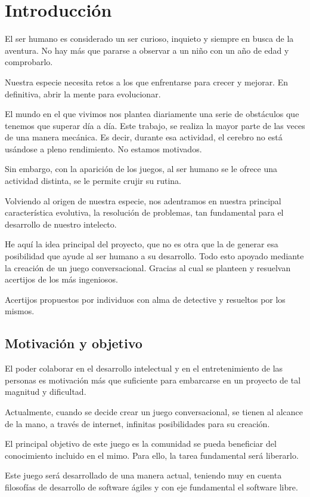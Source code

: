\chapter{Introducción}
El ser humano es considerado un ser curioso, inquieto y siempre en busca de la aventura. No hay más que pararse a observar a un niño con un año de edad y comprobarlo.

Nuestra especie necesita retos a los que enfrentarse para crecer y mejorar. En definitiva, abrir la mente para evolucionar.

El mundo en el que vivimos nos plantea diariamente una serie de obstáculos que tenemos que superar día a día. Este trabajo, se realiza la mayor parte de las veces de una manera mecánica. Es decir, durante esa actividad, el cerebro no está usándose a pleno rendimiento. No estamos motivados.

Sin embargo, con la aparición de los juegos, al ser humano se le ofrece una actividad distinta, se le permite crujir su rutina.

Volviendo al origen de nuestra especie, nos adentramos en nuestra principal característica evolutiva, la resolución de problemas, tan fundamental para el desarrollo de nuestro intelecto.

He aquí la idea principal del proyecto, que no es otra que la de generar esa posibilidad que ayude al ser humano a su desarrollo. Todo esto apoyado mediante la creación de un juego conversacional. Gracias al cual se planteen y resuelvan acertijos de los más ingeniosos. 

Acertijos propuestos por individuos con alma de detective y resueltos por los mismos.

\section{Motivación y objetivo}

El poder colaborar en el desarrollo intelectual y en el entretenimiento de las personas es motivación más que suficiente para embarcarse en un proyecto de tal magnitud y dificultad.

Actualmente, cuando se decide crear un juego conversacional, se tienen al alcance de la mano, a través de internet, infinitas posibilidades para su creación.

El principal objetivo de este juego es la comunidad se pueda beneficiar del conocimiento incluido en el mimo. Para ello, la tarea fundamental será liberarlo.

Este juego será desarrollado de una manera actual, teniendo muy en cuenta filosofías de desarrollo de software ágiles y con eje fundamental el software libre. 

